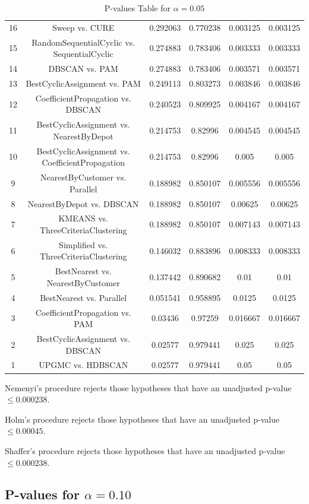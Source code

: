 \documentclass[a4paper,10pt]{article}
\begin{document}
\begin{landscape}
\begin{table}[!htp]
\begin{tabular}{cccccc}
16&Sweep vs. CURE&0.292063&0.770238&0.003125&0.003125\\
15&RandomSequentialCyclic vs. SequentialCyclic&0.274883&0.783406&0.003333&0.003333\\
14&DBSCAN vs. PAM&0.274883&0.783406&0.003571&0.003571\\
13&BestCyclicAssignment vs. PAM&0.249113&0.803273&0.003846&0.003846\\
12&CoefficientPropagation vs. DBSCAN&0.240523&0.809925&0.004167&0.004167\\
11&BestCyclicAssignment vs. NearestByDepot&0.214753&0.82996&0.004545&0.004545\\
10&BestCyclicAssignment vs. CoefficientPropagation&0.214753&0.82996&0.005&0.005\\
9&NearestByCustomer vs. Parallel&0.188982&0.850107&0.005556&0.005556\\
8&NearestByDepot vs. DBSCAN&0.188982&0.850107&0.00625&0.00625\\
7&KMEANS vs. ThreeCriteriaClustering&0.188982&0.850107&0.007143&0.007143\\
6&Simplified vs. ThreeCriteriaClustering&0.146032&0.883896&0.008333&0.008333\\
5&BestNearest vs. NearestByCustomer&0.137442&0.890682&0.01&0.01\\
4&BestNearest vs. Parallel&0.051541&0.958895&0.0125&0.0125\\
3&CoefficientPropagation vs. PAM&0.03436&0.97259&0.016667&0.016667\\
2&BestCyclicAssignment vs. DBSCAN&0.02577&0.979441&0.025&0.025\\
1&UPGMC vs. HDBSCAN&0.02577&0.979441&0.05&0.05\\
\hline
\end{tabular}
\caption{P-values Table for $\alpha=0.05$}
\end{table}Nemenyi's procedure rejects those hypotheses that have an unadjusted p-value $\le0.000238$.

Holm's procedure rejects those hypotheses that have an unadjusted p-value $\le0.00045$.

Shaffer's procedure rejects those hypotheses that have an unadjusted p-value $\le0.000238$.

\pagebreak

\subsection{P-values for $\alpha=0.10$}


\end{landscape}
\end{document}
